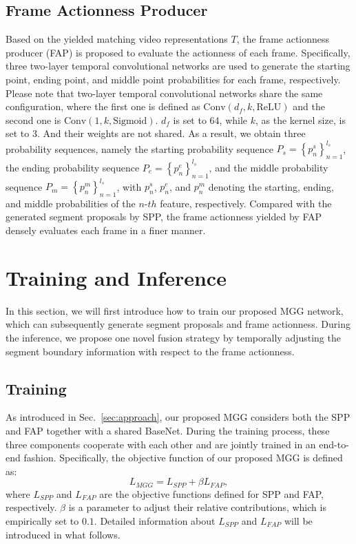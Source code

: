 \documentclass[10pt,twocolumn,letterpaper]{article}
\begin{document}
\subsection{Frame Actionness Producer}
Based on the yielded matching video representations $T$, the frame actionness producer (FAP) is proposed to evaluate the actionness  of each frame. Specifically, three two-layer temporal convolutional networks are used to generate the starting point, ending point, and middle point probabilities for each frame, respectively. Please note that two-layer temporal convolutional networks share the same configuration, where the first one is defined as $\text{Conv}(d_f,k,\text{ReLU})$ and the second one is  $\text{Conv}(1,k,\text{Sigmoid})$. $d_f$ is set to 64, while $k$, as the kernel size, is set to 3. And their weights are not shared. As a result, we obtain three probability sequences, namely the  starting probability sequence $P_{s}=\left\{p_{n}^{s}\right\}_{n=1}^{l_{s}}$, the ending probability sequence
$P_{e}=\left\{p_{n}^{e}\right\}_{n=1}^{l_{s}}$, and
the middle probability sequence $P_{m}=\left\{p_{n}^{m}\right\}_{n=1}^{l_{s}}$, with  $p_{n}^{s}$,  $p_{n}^{e}$, and $p_{n}^{m}$ denoting the starting,  ending, and middle probabilities of the $n$-$th$ feature, respectively. Compared with the generated segment proposals by SPP, the frame actionness yielded by FAP densely evaluates each frame in a finer manner.   


\section{Training and Inference}

In this section, we will first introduce how to train our proposed MGG network, which can subsequently generate segment proposals and frame  actionness. During the inference, we propose one novel fusion strategy by temporally adjusting the  segment boundary information with respect to the frame actionness. 
 
\subsection{Training}
As introduced in Sec.~\ref{sec:approach}, our proposed MGG considers both the SPP and FAP together with a shared BaseNet. During the training process, these three components cooperate with each other and are jointly trained in an end-to-end fashion. Specifically, the objective function of our proposed MGG is defined as:
\begin{equation}
L_{MGG} = L_{SPP}+\beta L_{FAP},
\end{equation}
where $L_{SPP}$ and $L_{FAP}$ are the objective functions defined for SPP and FAP, respectively. $\beta$ is a parameter to adjust their relative contributions, which is empirically set to $0.1$. Detailed information about $L_{SPP}$ and $L_{FAP}$ will be introduced in what follows.
\end{document}
